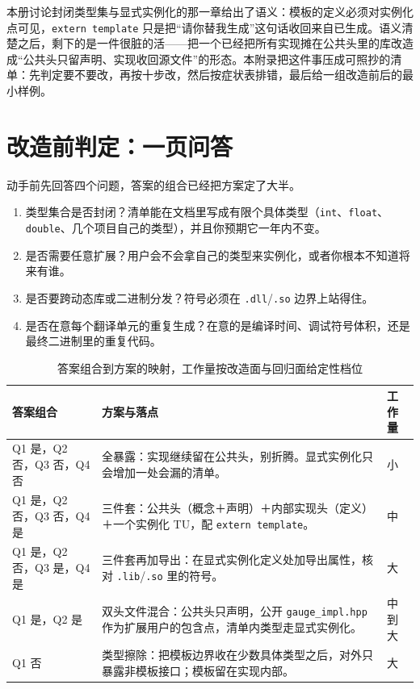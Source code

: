 \documentclass[12pt,a4paper,fontset=fandol]{ctexbook}
\newcommand{\kw}[1]{\texttt{#1}}
\begin{document}
本册讨论封闭类型集与显式实例化的那一章给出了语义：模板的定义必须对实例化点可见，\kw{extern template} 只是把“请你替我生成”这句话收回来自已生成。语义清楚之后，剩下的是一件很脏的活——把一个已经把所有实现摊在公共头里的库改造成“公共头只留声明、实现收回源文件”的形态。本附录把这件事压成可照抄的清单：先判定要不要改，再按十步改，然后按症状表排错，最后给一组改造前后的最小样例。

\section{改造前判定：一页问答}

动手前先回答四个问题，答案的组合已经把方案定了大半。

\begin{enumerate}
\item [{Q1}] 类型集合是否封闭？清单能在文档里写成有限个具体类型（\kw{int}、\kw{float}、\kw{double}、几个项目自己的类型），并且你预期它一年内不变。
\item [{Q2}] 是否需要任意扩展？用户会不会拿自己的类型来实例化，或者你根本不知道将来有谁。
\item [{Q3}] 是否要跨动态库或二进制分发？符号必须在 \texttt{.dll}/\texttt{.so} 边界上站得住。
\item [{Q4}] 是否在意每个翻译单元的重复生成？在意的是编译时间、调试符号体积，还是最终二进制里的重复代码。
\end{enumerate}

\begin{table}
\centering
\begin{tabularx}{\textwidth}{>{\raggedright\arraybackslash}p{} X >{\raggedright\arraybackslash}p{}}
\toprule
\textbf{答案组合} & \textbf{方案与落点} & \textbf{工作量} \\
\midrule
Q1 是，Q2 否，Q3 否，Q4 否
& 全暴露：实现继续留在公共头，别折腾。显式实例化只会增加一处会漏的清单。
& 小 \\
\addlinespace
Q1 是，Q2 否，Q3 否，Q4 是
& 三件套：公共头（概念＋声明）＋内部实现头（定义）＋一个实例化 TU，配 \kw{extern template}。
& 中 \\
\addlinespace
Q1 是，Q2 否，Q3 是，Q4 是
& 三件套再加导出：在显式实例化定义处加导出属性，核对 \texttt{.lib}/\texttt{.so} 里的符号。
& 大 \\
\addlinespace
Q1 是，Q2 是
& 双头文件混合：公共头只声明，公开 \kw{gauge\_impl.hpp} 作为扩展用户的包含点，清单内类型走显式实例化。
& 中到大 \\
\addlinespace
Q1 否
& 类型擦除：把模板边界收在少数具体类型之后，对外只暴露非模板接口；模板留在实现内部。
& 大 \\
\bottomrule
\end{tabularx}
\caption{答案组合到方案的映射，工作量按改造面与回归面给定性档位}
\end{table}
\end{document}

